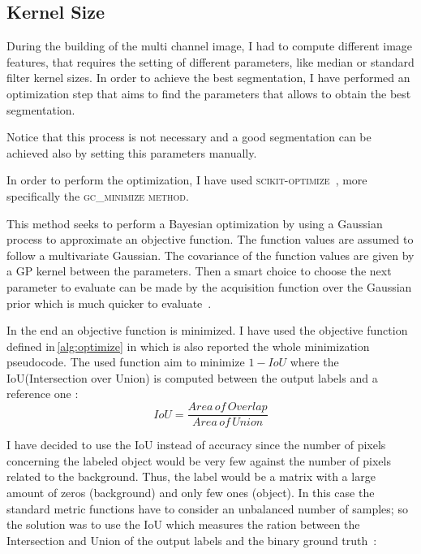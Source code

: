\documentclass{standalone}
\begin{document}
	\subsection{Kernel Size}
	
	During the building of the multi channel image, I had to compute different image features, that requires the setting of different parameters, like median or standard filter kernel sizes. In order to achieve the best segmentation, I have performed an optimization step that aims to find the parameters that allows to obtain the best segmentation. 
	
	Notice that this process is not necessary and a good segmentation can be achieved also by setting this parameters manually.

	In order to perform the optimization, I have used \textsc{scikit-optimize}~\cite{skopt}, more specifically the \textsc{gc\_minimize method}.
	
	This method seeks to perform a Bayesian optimization by using a Gaussian process to approximate an objective function. The function values are assumed to follow a multivariate Gaussian. The covariance of the function values are given by a GP kernel between the parameters. Then a smart choice to choose the next parameter to evaluate can be made by the acquisition function over the Gaussian prior which is much quicker to evaluate~\cite{skopt}.

	In the end an objective function is minimized. I have used the objective function defined in\,\ref{alg:optimize} in which is also reported the whole minimization pseudocode. The used function aim to minimize $1 - IoU$ where the IoU(Intersection over Union) is computed between the output labels and a reference one :
	\begin{equation*}
			IoU = \frac{Area\,of\,Overlap}{Area\,of\,Union}
			\label{eq:IoU}
	\end{equation*}
		
	
	I have decided to use the IoU instead of accuracy since the number of pixels concerning the labeled object would be very few against the number of pixels related to the background. Thus, the label would be a matrix with a large amount of zeros (background) and only few ones (object). In this case the standard metric functions have to consider an unbalanced number of samples; so the solution was to use the IoU which  measures the ration between the Intersection and Union of the output labels and the binary ground truth~\cite{PhDtheis}:
\end{document}
